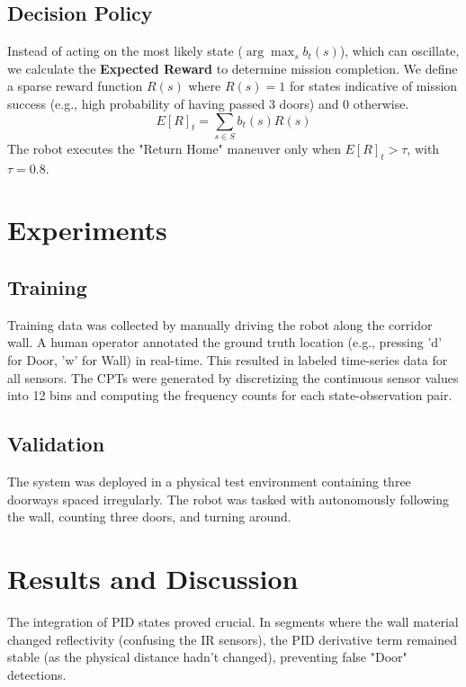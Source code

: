 \documentclass[10pt, twocolumn]{article}
\begin{document}
\subsection{Decision Policy}
Instead of acting on the most likely state (\(\arg\max_s b_t(s)\)), which can oscillate, we calculate the \textbf{Expected Reward} to determine mission completion. We define a sparse reward function \(R(s)\) where \(R(s)=1\) for states indicative of mission success (e.g., high probability of having passed 3 doors) and 0 otherwise.
\begin{equation}
E[R]_t = \sum_{s \in S} b_t(s) R(s)
\end{equation}
The robot executes the "Return Home" maneuver only when \(E[R]_t > \tau\), with \(\tau = 0.8\).

\section{Experiments}
\subsection{Training}
Training data was collected by manually driving the robot along the corridor wall. A human operator annotated the ground truth location (e.g., pressing 'd' for Door, 'w' for Wall) in real-time. This resulted in labeled time-series data for all sensors. The CPTs were generated by discretizing the continuous sensor values into 12 bins and computing the frequency counts for each state-observation pair.

\subsection{Validation}
The system was deployed in a physical test environment containing three doorways spaced irregularly. The robot was tasked with autonomously following the wall, counting three doors, and turning around.

\section{Results and Discussion}
The integration of PID states proved crucial. In segments where the wall material changed reflectivity (confusing the IR sensors), the PID derivative term remained stable (as the physical distance hadn't changed), preventing false "Door" detections.
\end{document}
